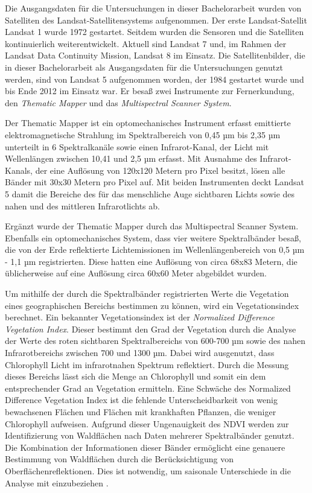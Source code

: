 Die Ausgangsdaten für die Untersuchungen in dieser Bachelorarbeit wurden von Satelliten des Landsat-Satellitensystems aufgenommen. Der erste Landsat-Satellit Landsat 1 wurde 1972 gestartet. Seitdem wurden die Sensoren und die Satelliten kontinuierlich weiterentwickelt. Aktuell sind Landsat 7 und, im Rahmen der Landsat Data Continuity Mission, Landsat 8 im Einsatz. Die Satellitenbilder, die in dieser Bachelorarbeit als Ausgangsdaten für die Untersuchungen genutzt werden, sind von Landsat 5 aufgenommen worden, der 1984 gestartet wurde und bis Ende 2012 im Einsatz war. Er besaß zwei Instrumente zur Fernerkundung, den \textit{Thematic Mapper} und das \textit{Multispectral Scanner System}.

Der Thematic Mapper ist ein optomechanisches Instrument  erfasst emittierte elektromagnetische Strahlung im Spektralbereich von 0,45 µm bis 2,35 µm unterteilt in 6 Spektralkanäle sowie einen Infrarot-Kanal, der Licht mit Wellenlängen zwischen 10,41 und 2,5 µm erfasst. Mit Ausnahme des Infrarot-Kanals, der eine Auflösung von 120x120 Metern pro Pixel besitzt, lösen alle Bänder mit 30x30 Metern pro Pixel auf. Mit beiden Instrumenten deckt Landsat 5 damit die Bereiche des für das menschliche Auge sichtbaren Lichts sowie des nahen und des mittleren Infrarotlichts ab.

Ergänzt wurde der Thematic Mapper durch das Multispectral Scanner System. Ebenfalls ein optomechanisches System, dass vier weitere Spektralbänder besaß, die von der Erde reflektierte Lichtemissionen im Wellenlängenbereich von 0,5 µm - 1,1 µm registrierten. Diese hatten eine Auflösung von circa 68x83 Metern, die üblicherweise auf eine Auflösung circa 60x60 Meter abgebildet wurden.  

Um mithilfe der durch die Spektralbänder registrierten Werte die Vegetation eines geographischen Bereichs bestimmen zu können, wird ein Vegetationsindex berechnet. Ein bekannter Vegetationsindex ist der \textit{Normalized Difference Vegetation Index}. Dieser bestimmt den Grad der Vegetation durch die Analyse der Werte des roten sichtbaren Spektralbereichs von 600-700 µm sowie des nahen Infrarotbereichs zwischen 700 und 1300 µm. Dabei wird ausgenutzt, dass Chlorophyll Licht im infrarotnahen Spektrum reflektiert. Durch die Messung dieses Bereichs lässt sich die Menge an Chlorophyll und somit ein dem entsprechender Grad an Vegetation ermitteln. Eine Schwäche des Normalized Difference Vegetation Index ist die fehlende Unterscheidbarkeit von wenig bewachsenen Flächen und Flächen mit krankhaften Pflanzen, die weniger Chlorophyll aufweisen. Aufgrund dieser Ungenauigkeit des NDVI werden zur Identifizierung von Waldflächen nach \cite{Zhu2012} Daten mehrerer Spektralbänder genutzt. Die Kombination der Informationen dieser Bänder ermöglicht eine genauere Bestimmung von Waldflächen durch die Berücksichtigung von Oberflächenreflektionen. Dies ist notwendig, um saisonale Unterschiede in die Analyse mit einzubeziehen \cite{Zhu2012, Masek2008}.

